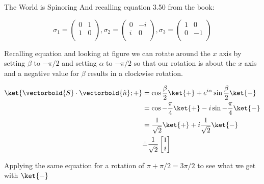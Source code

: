\begin{answer}

  \begin{answerpart}{The World is Spinoring}
    And recalling equation 3.50 from the book:
    
    \begin{equation*}
      \tag{3.50}
      \sigma_1 =
      \begin{pmatrix}
        0 & 1 \\
        1 & 0 \\
      \end{pmatrix},
      \sigma_2 =
      \begin{pmatrix}
        0 & -i \\
        i &  0 \\
      \end{pmatrix},
      \sigma_3 =
      \begin{pmatrix}
        1 &  0 \\
        0 & -1 \\
      \end{pmatrix}
    \end{equation*}

    Recalling equation  and looking at figure
     we can rotate around the $x$ axis by
    setting $\beta$ to $-\pi/2$ and setting $\alpha$ to $-\pi/2$ so
    that our rotation is about the $x$ axis and a negative value for
    $\beta$ results in a clockwise rotation.

    \begin{equation}
      \begin{split}
        \ket{\vectorbold{S}\cdot\vectorbold{\hat{n}}; +}
        &= \cos{\frac{\beta}{2}} \ket{+} + e^{i\alpha}\sin{\frac{\beta}{2}} \ket{-}
        \\
        &= \cos{-\frac{\pi}{4}}\ket{+} - i\sin{-\frac{\pi}{4}} \ket{-}
        \\
        &= \frac{1}{\sqrt{2}}\ket{+} + i\frac{1}{\sqrt{2}}\ket{-}
        \\
        &\dot{=} \frac{1}{\sqrt{2}}
        \begin{bmatrix}
          1\\i\\
        \end{bmatrix}
        \\
      \end{split}
    \end{equation}

    Applying the same equation for a rotation of $\pi+\pi/2=3\pi/2$ to
    see what we get with $\ket{-}$


\end{answerpart}
\end{answer}
